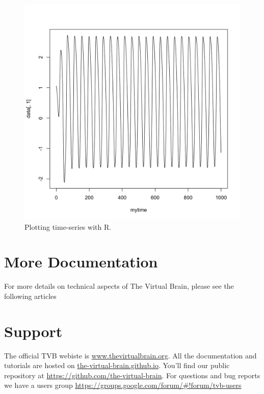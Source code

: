 \documentclass{tufte-handout}
\begin{document}
\begin{figure}[h]
  \includegraphics[width=\linewidth]{Handout_UI_LinkAndShare_RTimeSeriesRegion.png}%
  \caption{Plotting time-series with R.}%
  \label{fig:r}%
\end{figure}



\section{More Documentation}\label{sec:more-doc}

For more details on technical aspects of The Virtual Brain, please see the following articles
\citep{Sanz-Leon_2013, Woodman_2014}

\section{Support}\label{sec:support}

The official TVB webiste is \url{www.thevirtualbrain.org}.  
All the documentation and tutorials are hosted on \url{the-virtual-brain.github.io}.
You'll find our public  repository at \url{https://github.com/the-virtual-brain}. 
For questions and bug reports we have a users group \url{https://groups.google.com/forum/#!forum/tvb-users}



\end{document}
